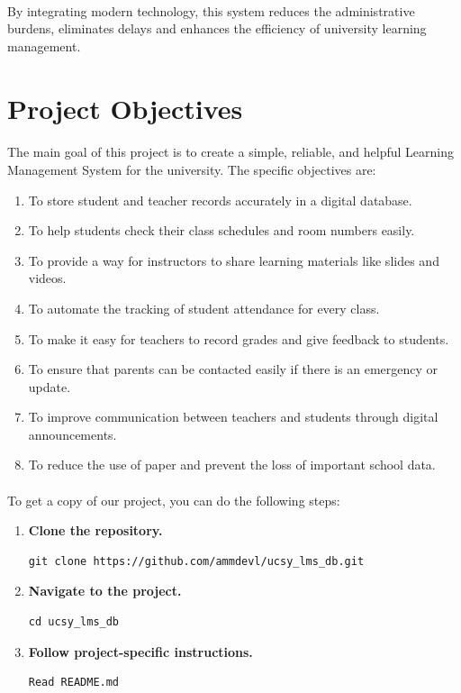 \documentclass[12pt,a4paper]{report}
\begin{document}
\paragraph{}
\indent By integrating modern technology, this system reduces the administrative burdens, eliminates delays and enhances the efficiency of university learning management.
\newline
\newpage
\section{Project Objectives}
\paragraph{}
\indent The main goal of this project is to create a simple, reliable, and helpful Learning Management System for the university. The specific objectives are:
\begin{enumerate}
    \item To store student and teacher records accurately in a digital database.
    \item To help students check their class schedules and room numbers easily.
    \item To provide a way for instructors to share learning materials like slides and videos.
    \item To automate the tracking of student attendance for every class.
    \item To make it easy for teachers to record grades and give feedback to students.
    \item To ensure that parents can be contacted easily if there is an emergency or update.
    \item To improve communication between teachers and students through digital announcements.
    \item To reduce the use of paper and prevent the loss of important school data.
\end{enumerate}
\vspace{0.5cm}

\paragraph{}
\indent To get a copy of our project, you can do the following steps:
\begin{enumerate}
\item \textbf{Clone the repository.}
\begin{verbatim}
git clone https://github.com/ammdevl/ucsy_lms_db.git
\end{verbatim}

\item \textbf{Navigate to the project.}
\begin{verbatim}
cd ucsy_lms_db
\end{verbatim}

\item \textbf{Follow project-specific instructions.}
\begin{verbatim}
Read README.md
\end{verbatim}
\end{enumerate}
\newpage
\end{document}

